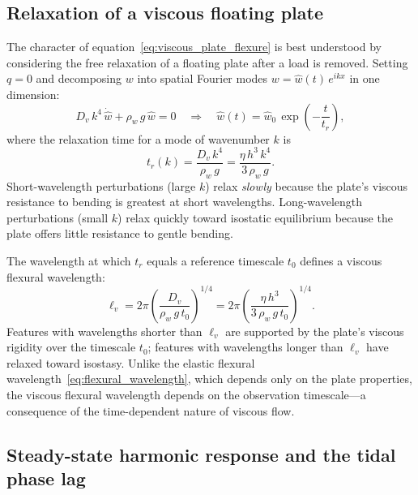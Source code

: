 \documentclass[11pt]{article}
\begin{document}
\subsection*{Relaxation of a viscous floating plate}

The character of equation~\eqref{eq:viscous_plate_flexure} is best understood by considering the free relaxation of a floating plate after a load is removed.  Setting $q = 0$ and decomposing $w$ into spatial Fourier modes $w = \hat{w}(t)\,e^{ikx}$ in one dimension:
\begin{equation}
  D_v\,k^4\,\dot{\hat{w}} + \rho_w\,g\,\hat{w} = 0 \quad \Longrightarrow \quad \hat{w}(t) = \hat{w}_0\,\exp\!\left(-\frac{t}{t_r}\right),
  \label{eq:viscous_relaxation}
\end{equation}
where the relaxation time for a mode of wavenumber $k$ is
\begin{equation}
  \boxed{t_r(k) = \frac{D_v\,k^4}{\rho_w\,g} = \frac{\eta\,h^3\,k^4}{3\,\rho_w\,g}.}
  \label{eq:viscous_relaxation_time}
\end{equation}
Short-wavelength perturbations (large $k$) relax \textit{slowly} because the plate's viscous resistance to bending is greatest at short wavelengths.  Long-wavelength perturbations (small $k$) relax quickly toward isostatic equilibrium because the plate offers little resistance to gentle bending.

\medskip
\noindent The wavelength at which $t_r$ equals a reference timescale $t_0$ defines a viscous flexural wavelength:
\begin{equation}
  \ell_v = 2\pi\!\left(\frac{D_v}{\rho_w\,g\,t_0}\right)^{1/4}\!\!= 2\pi\!\left(\frac{\eta\,h^3}{3\,\rho_w\,g\,t_0}\right)^{1/4}\!\!.
  \label{eq:viscous_flexural_wavelength}
\end{equation}
Features with wavelengths shorter than $\ell_v$ are supported by the plate's viscous rigidity over the timescale $t_0$; features with wavelengths longer than $\ell_v$ have relaxed toward isostasy.  Unlike the elastic flexural wavelength~\eqref{eq:flexural_wavelength}, which depends only on the plate properties, the viscous flexural wavelength depends on the observation timescale---a consequence of the time-dependent nature of viscous flow.

\subsection*{Steady-state harmonic response and the tidal phase lag}
\end{document}
